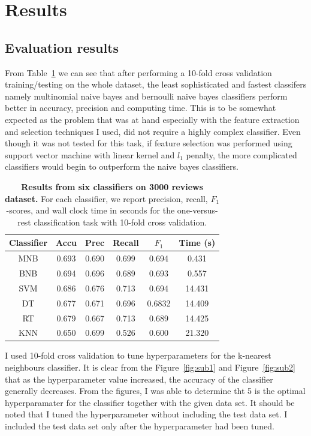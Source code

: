 \documentclass{article} %
\begin{document}
\section{Results}
\subsection{Evaluation results}
From Table~\ref{tab:classifiers} we can see that after performing a 10-fold cross validation training/testing on the whole dataset, the least sophisticated and fastest classifers namely multinomial naive bayes and bernoulli naive bayes classifiers perform better in accuracy, precision and computing time. This is to be somewhat expected as the problem that was at hand especially with the feature extraction and selection techniques I used, did not require a highly complex classifier. Even though it was not tested for this task, if feature selection was performed using support vector machine with linear kernel and $l_1$ penalty, the more complicated classifiers would begin to outperform the naive bayes classifiers. 


\begin{table}[H]
\centering
   \begin{tabular}{@{}|c|c|c|c|c|c|@{}} %
	
   \hline

   Classifier & Accu & Prec & Recall & $F_1$ & Time (s) \\ \hline 
      MNB & 0.693 & 0.690 & 0.699 & 0.694 & 0.431 \\
       BNB & 0.694&  0.696 & 0.689 & 0.693 & 0.557\\
      SVM    &  0.686 & 0.676 & 0.713 & 0.694 & 14.431\\
        DT  &  0.677 & 0.671 & 0.696 & 0.6832 & 14.409 \\
      RT &  0.679 & 0.667 & 0.713 & 0.689 & 14.425  \\
      KNN &  0.650 & 0.699 & 0.526 & 0.600 & 21.320 \\
     \hline
   \end{tabular}
\caption{{\bf Results from six classifiers on 3000 reviews dataset.} For each classifier, we report precision, recall,  $F_1$-scores, and wall clock time in seconds for the one-versus-rest classification task with 10-fold cross validation.}
   \label{tab:classifiers}
\end{table}

I used 10-fold cross validation to tune hyperparameters for the k-nearest neighbours classifier. It is clear from the  Figure~\ref{fig:sub1} and Figure~\ref{fig:sub2} that as the hyperparameter value increased, the accuracy of the classifier generally decreases. From the figures, I was able to determine tht 5 is the optimal hyperparamater for the classifier together with the given data set.  It should be noted that I tuned the hyperparameter without including the test data set. I included the test data set only after the hyperparameter had been tuned. 
\end{document}

